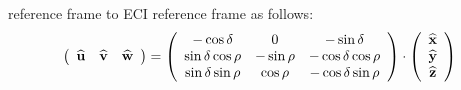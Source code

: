 \documentclass{article}
\newcommand{\tmstrong}[1]{\textbf{#1}}
\begin{document}
reference frame to ECI reference frame as follows:
\[ \left(\begin{array}{ccc}
     \widehat{\text{{\tmstrong{u}}}} & \widehat{\text{{\tmstrong{v}}}} &
     \widehat{\text{{\tmstrong{w}}}}
   \end{array}\right) = \left(\begin{array}{ccc}
     - \cos \delta & 0 & - \sin \delta\\
     \sin \delta \cos \rho & - \sin \rho & - \cos \delta \cos \rho\\
     \sin \delta \sin \rho & \cos \rho & - \cos \delta \sin \rho
   \end{array}\right) \cdot \left(\begin{array}{c}
     \text{$\widehat{\text{{\tmstrong{x}}}}$}\\
     \text{$\widehat{\text{{\tmstrong{y}}}}$}\\
     \text{$\widehat{\text{{\tmstrong{z}}}}$}
   \end{array}\right) \]
\end{document}
